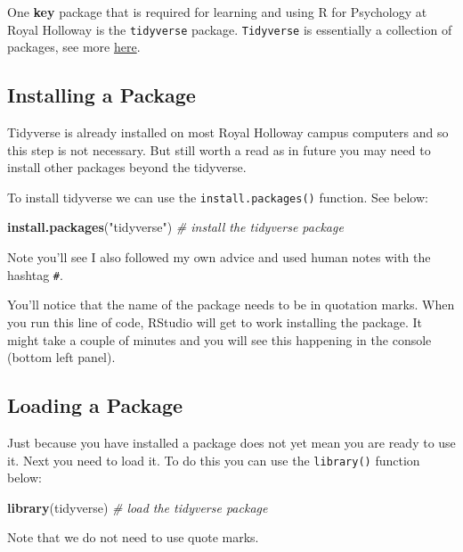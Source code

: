 \documentclass[
]{book}
\newenvironment{Shaded}{\begin{snugshade}}{\end{snugshade}}
\newcommand{\CommentTok}[1]{\textcolor[rgb]{0.56,0.35,0.01}{\textit{#1}}}
\newcommand{\FunctionTok}[1]{\textcolor[rgb]{0.13,0.29,0.53}{\textbf{#1}}}
\newcommand{\NormalTok}[1]{#1}
\newcommand{\StringTok}[1]{\textcolor[rgb]{0.31,0.60,0.02}{#1}}
\let\oldsubsection\subsection
\renewcommand{\subsection}{\needspace{3\baselineskip}\oldsubsection}  %
\begin{document}
One \textbf{key} package that is required for learning and using R for Psychology at Royal Holloway is the \texttt{tidyverse} package. \texttt{Tidyverse} is essentially a collection of packages, see more \href{https://www.tidyverse.org/}{here}.

\subsection{Installing a Package}\label{installing-a-package}

Tidyverse is already installed on most Royal Holloway campus computers and so this step is not necessary. But still worth a read as in future you may need to install other packages beyond the tidyverse.

To install tidyverse we can use the \texttt{install.packages()} function. See below:

\begin{Shaded}
\begin{Highlighting}[]
\FunctionTok{install.packages}\NormalTok{(}\StringTok{"tidyverse"}\NormalTok{) }\CommentTok{\# install the tidyverse package}
\end{Highlighting}
\end{Shaded}

Note you'll see I also followed my own advice and used human notes with the hashtag \texttt{\#}.

You'll notice that the name of the package needs to be in quotation marks. When you run this line of code, RStudio will get to work installing the package. It might take a couple of minutes and you will see this happening in the console (bottom left panel).

\subsection{Loading a Package}\label{loading-a-package}

Just because you have installed a package does not yet mean you are ready to use it. Next you need to load it. To do this you can use the \texttt{library()} function below:

\begin{Shaded}
\begin{Highlighting}[]
\FunctionTok{library}\NormalTok{(tidyverse) }\CommentTok{\# load the tidyverse package}
\end{Highlighting}
\end{Shaded}

Note that we do not need to use quote marks.
\end{document}
